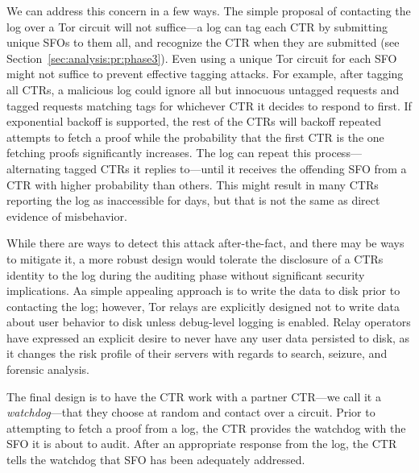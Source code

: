 We can address this concern in a few ways. The simple proposal of contacting the
log over a Tor circuit will not suffice---a log can tag each CTR by submitting
unique SFOs to them all, and recognize the CTR when they are submitted (see
Section~\ref{sec:analysis:pr:phase3}). Even using a unique Tor circuit for each
SFO might not suffice to prevent effective tagging attacks. For example, after
tagging all CTRs, a malicious log could ignore all but innocuous untagged
requests and tagged requests matching tags for whichever CTR it decides to
respond to first. If exponential backoff is supported, the rest of the CTRs will
backoff repeated attempts to fetch a proof while the probability that the first
CTR is the one fetching proofs significantly increases. The log can repeat this
process---alternating tagged CTRs it replies to---until it receives the
offending SFO from a CTR with higher probability than others. This might result
in many CTRs reporting the log as inaccessible for days, but that is not the
same as direct evidence of misbehavior.

While there are ways to detect this attack after-the-fact, and there may be ways
to mitigate it, a more robust design would tolerate the disclosure of a CTRs
identity to the log during the auditing phase without significant security
implications.  Aa simple appealing approach is to write the data to disk prior
to contacting the log; however, Tor relays are explicitly designed not to write
data about user behavior to disk unless debug-level logging is enabled. Relay
operators have expressed an explicit desire to never have any user data
persisted to disk, as it changes the risk profile of their servers with regards
to search, seizure, and forensic analysis.

The final design is to have the CTR work with a partner CTR---we call it a
\emph{watchdog}---that they choose at random and contact over a circuit. Prior
to attempting to fetch a proof from a log, the CTR provides the watchdog with
the SFO it is about to audit. After an appropriate response from the log, the
CTR tells the watchdog that SFO has been adequately addressed.

